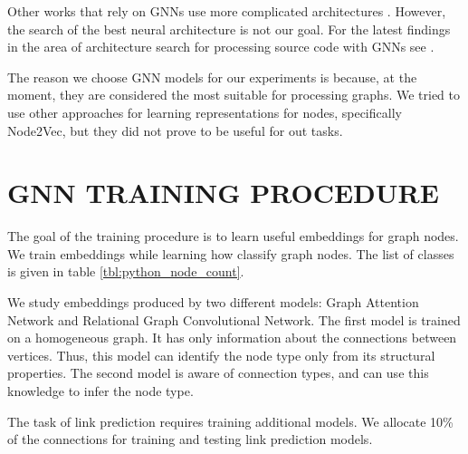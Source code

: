 \documentclass[a4paper,twoside]{article}
\begin{document}
Other works that rely on GNNs use more complicated architectures \cite{Allamanis2017} \cite{Cvitkovic2018}. However, the search of the best neural architecture is not our goal. For the latest findings in the area of architecture search for processing source code with GNNs see \cite{hellendoorn2020global}.

The reason we choose GNN models for our experiments is because, at the moment, they are considered the most suitable for processing graphs. 
We tried to use other approaches for learning representations for nodes, specifically Node2Vec, but they did not prove to be useful for out tasks.





\section{\uppercase{GNN Training Procedure}}

The goal of the training procedure is to learn useful embeddings for graph nodes. We train embeddings while learning how classify graph nodes. The list of classes is given in table \ref{tbl:python_node_count}.

We study embeddings produced by two different models: Graph Attention Network and Relational Graph Convolutional Network. The first model is trained on a homogeneous graph. It has only information about the connections between vertices. Thus, this model can identify the node type only from its structural properties. The second model is aware of connection types, and can use this knowledge to infer the node type.

The task of link prediction requires training additional models. We allocate 10\% of the connections for training and testing link prediction models.
\end{document}
